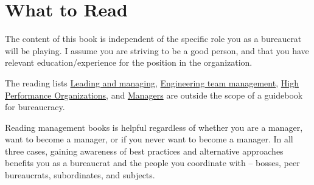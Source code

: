 \section{What to Read\label{sec:to_read}}

The content of this book is independent of the specific role you as a bureaucrat will be playing. I assume you are striving to be a good person, and that you have relevant education/experience for the position in the organization.

The reading lists 
\href{https://github.com/LappleApple/awesome-leading-and-managing}{Leading and managing}, 
\href{https://github.com/kdeldycke/awesome-engineering-team-management}{Engineering team management}, 
\href{https://github.com/pdfernhout/High-Performance-Organizations-Reading-List}{High Performance Organizations}, and 
\href{https://github.com/ankitjaininfo/awesome-managers}{Managers}
are outside the scope of a guidebook for bureaucracy. 


Reading management books is helpful regardless of whether you are a manager, want to become a manager, or if you never want to become a manager. In all three cases, gaining awareness of best practices and alternative approaches benefits you as a bureaucrat and the people you coordinate with -- bosses, peer bureaucrats, subordinates, and subjects.
